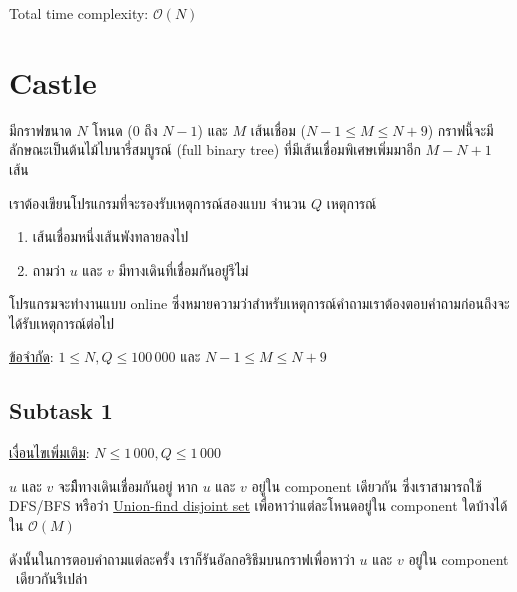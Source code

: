 \documentclass[12pt]{article}
\begin{document}
Total time complexity: $\mathcal{O}(N)$

\newpage



























\section{Castle}




มีกราฟขนาด $N$ โหนด ($0$ ถึง $N-1$) และ $M$ เส้นเชื่อม ($N-1 \leq M \leq N+9$) กราฟนี้จะมีลักษณะเป็นต้นไม้ไบนารี่สมบูรณ์ (full binary tree) ที่มีเส้นเชื่อมพิเศษเพิ่มมาอีก $M-N+1$ เส้น 

เราต้องเขียนโปรแกรมที่จะรองรับเหตุการณ์สองแบบ จำนวน $Q$ เหตุการณ์
\begin{enumerate}
  \item เส้นเชื่อมหนึ่งเส้นพังทลายลงไป
  \item ถามว่า $u$ และ $v$ มีทางเดินที่เชื่อมกันอยู่รึไม่
\end{enumerate}

โปรแกรมจะทำงานแบบ online ซึ่งหมายความว่าสำหรับเหตุการณ์คำถามเราต้องตอบคำถามก่อน​ถึงจะได้รับเหตุการณ์ต่อไป

\underline{ข้อจำกัด}: $1 \leq N, Q \leq 100\,000$ และ $N-1 \leq M \leq N+9$

\subsection{Subtask 1}

\underline{เงื่อนไขเพิ่มเติม}: $N \leq 1\,000, Q \leq 1\,000$

$u$ และ $v$ จะมีืทางเดินเชื่อมกันอยู่ หาก $u$ และ $v$ อยู่ใน component เดียวกัน ซึ่งเราสามารถใช้ DFS/BFS หรือว่า \href{https://en.wikipedia.org/wiki/Disjoint-set_data_structure}{Union-find disjoint set} เพื่อหาว่าแต่ละโหนดอยู่ใน component ใดบ้างได้ใน $\mathcal{O}(M)$

ดังนั้นในการตอบคำถามแต่ละครั้ง เราก็รันอัลกอริธึมบนกราฟเพื่อหาว่า $u$ และ $v$ อยู่ใน component \\\ เดียวกันรึเปล่า
\end{document}
